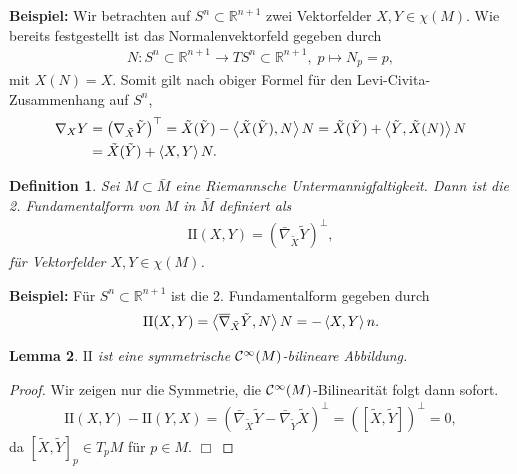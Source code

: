 \documentclass[12pt,a4paper]{article}
\def\R{\mathbb{R}}
\newtheorem{Lemma}{Lemma}[section]
\newtheorem{Definition}[Lemma]{Definition}
\def\qed{\quad\hfill\ensuremath{\Box}}
\begin{document}
\bigskip

{\bf Beispiel:}
Wir betrachten auf $S^n\subset\R^{n+1}$ zwei Vektorfelder $X,Y\in\chi(M)$. Wie
bereits festgestellt ist das Normalenvektorfeld gegeben durch 
\begin{align*}
N: S^n\subset\R^{n+1} \to TS^n \subset\R^{n+1},\; p\mapsto N_p = p,
\end{align*}
mit $X(N) = X$. Somit gilt nach obiger Formel f\"ur den Levi-Civita-Zusammenhang
auf $S^n$,
\begin{align*}
\nabla_XY &= \left(\nabla_{\tilde{X}}\tilde{Y} \right)^\top
= \tilde{X}(\tilde{Y}) - \left\langle\tilde{X}(\tilde{Y}),N\right\rangle N
= \tilde{X}(\tilde{Y}) + \left\langle\tilde{Y},\tilde{X}(N)\right\rangle N\\
&= \tilde{X}(\tilde{Y}) + \left\langle X,Y\right\rangle N.
\end{align*}

\bigskip

\newcommand{\II}{\mathrm{II}}

\begin{Definition}
Sei $M\subset\bar{M}$ eine Riemannsche Untermannigfaltigkeit. Dann ist die
\emph{2. Fundamentalform} von $M$ in $\bar{M}$ definiert als
\begin{align*}
\II(X,Y) = (\bar{\nabla}_{\tilde{X}} \tilde{Y} )^\bot,
\end{align*}
f\"ur Vektorfelder $X,Y\in\chi(M)$.
\end{Definition}

\bigskip

{\bf Beispiel:}
F\"ur $S^n\subset\R^{n+1}$ ist die 2. Fundamentalform gegeben durch
\begin{align*}
\II(X,Y) = \scp{\bar{\nabla}_{\tilde{X}}\tilde{Y},N}N
= -\scp{X,Y}n.
\end{align*}

\bigskip

\begin{Lemma}
$\II$ ist eine symmetrische $\mathcal{C}^\infty(M)$-bilineare Abbildung.
\end{Lemma}
\begin{proof}
Wir zeigen nur die Symmetrie, die $\mathcal{C}^\infty(M)$-Bilinearit\"at folgt dann
sofort.
\begin{align*}
\II(X,Y)-\II(Y,X) = \left(\bar{\nabla}_{\tilde{X}}\tilde{Y} -
\bar{\nabla}_{\tilde{Y}}\tilde{X} \right)^\bot =
\left([\tilde{X},\tilde{Y}] \right)^\bot = 0,
\end{align*}
da $[\tilde{X},\tilde{Y}]_p \in T_pM$ f\"ur $p\in M$.
\qed
\end{proof}
\end{document}
